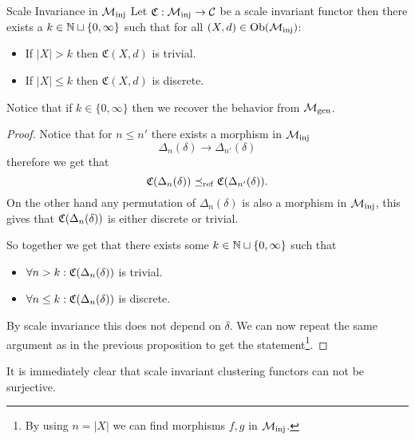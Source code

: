 \begin{proposition}{Scale Invariance in ${\mathcal{M}_\mathrm{inj}}$}{}
    Let $\mathfrak{C}: {\mathcal{M}_\mathrm{inj}} \to \mathcal{C}$ be a scale invariant functor then there exists a $k \in \mathbb N \sqcup \{0, \infty\}$ such that for all $(X,d) \in \mathrm {Ob}({\mathcal{M}_\mathrm{inj}})$:

    \begin{itemize}
        \item If $|X| > k$ then $\mathfrak{C}(X,d)$ is trivial.
        \item If $|X| \le k$ then $\mathfrak{C}(X,d)$ is discrete.
    \end{itemize}

    Notice that if $k \in \{0, \infty\}$ then we recover the behavior from ${\mathcal{M}_\mathrm{gen}}$.
\end{proposition}

\begin{proof}
    \source[]
    Notice that for $n \le n'$ there exists a morphism in ${\mathcal{M}_\mathrm{inj}}$
    $$
    \Delta_n(\delta) \longrightarrow \Delta_{n'}(\delta)
    $$
    therefore we get that
    $$
    \mathfrak{C}(\Delta_n(\delta)) \preceq_\mathrm{ref} \mathfrak{C}(\Delta_{n'}(\delta)).
    $$
    On the other hand any permutation of $\Delta_n(\delta)$ is also a morphism in ${\mathcal{M}_\mathrm{inj}}$, this gives that $\mathfrak{C}(\Delta_n(\delta))$ is either discrete or trivial.

    So together we get that there exists some $k \in \mathbb N \sqcup \{0, \infty\}$ such that
    \begin{itemize}
        \item $\forall n > k: \mathfrak{C}(\Delta_n(\delta))$ is trivial.
        \item $\forall n \le k: \mathfrak{C}(\Delta_n(\delta))$ is discrete.
    \end{itemize}
    By scale invariance this does not depend on $\delta$. We can now repeat the same argument as in the previous proposition to get the statement\footnote{By using $n = |X|$ we can find morphisms $f,g$ in ${\mathcal{M}_\mathrm{inj}}$.}.

\end{proof}

It is immediately clear that scale invariant clustering functors can not be surjective.



